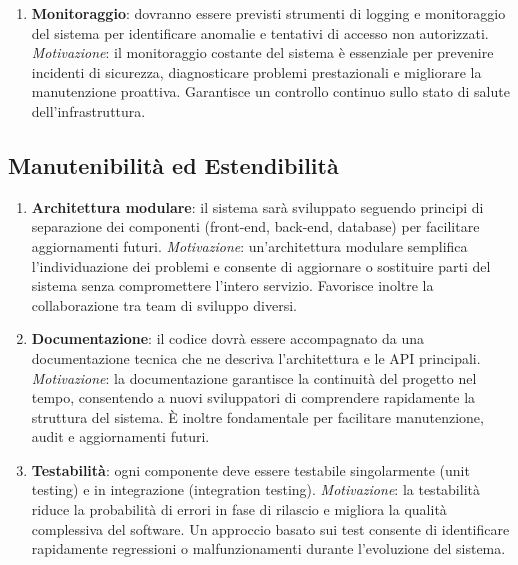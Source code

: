 \documentclass{article}
\begin{document}
\begin{enumerate}[label=\textbf{RNF\arabic*}, resume]
	\item \textbf{Monitoraggio}: dovranno essere previsti strumenti di logging e monitoraggio del sistema per identificare anomalie e tentativi di accesso non autorizzati.  
	\textit{Motivazione}: il monitoraggio costante del sistema è essenziale per prevenire incidenti di sicurezza, diagnosticare problemi prestazionali e migliorare la manutenzione proattiva. Garantisce un controllo continuo sullo stato di salute dell’infrastruttura.
\end{enumerate}

\subsection{Manutenibilit\`a ed Estendibilit\`a}
\begin{enumerate}[label=\textbf{RNF\arabic*}, resume]
	\item \textbf{Architettura modulare}: il sistema sarà sviluppato seguendo principi di separazione dei componenti (front-end, back-end, database) per facilitare aggiornamenti futuri.  
	\textit{Motivazione}: un’architettura modulare semplifica l’individuazione dei problemi e consente di aggiornare o sostituire parti del sistema senza compromettere l’intero servizio. Favorisce inoltre la collaborazione tra team di sviluppo diversi.

	\item \textbf{Documentazione}: il codice dovrà essere accompagnato da una documentazione tecnica che ne descriva l’architettura e le API principali.  
	\textit{Motivazione}: la documentazione garantisce la continuità del progetto nel tempo, consentendo a nuovi sviluppatori di comprendere rapidamente la struttura del sistema. È inoltre fondamentale per facilitare manutenzione, audit e aggiornamenti futuri.

	\item \textbf{Testabilità}: ogni componente deve essere testabile singolarmente (unit testing) e in integrazione (integration testing).  
	\textit{Motivazione}: la testabilità riduce la probabilità di errori in fase di rilascio e migliora la qualità complessiva del software. Un approccio basato sui test consente di identificare rapidamente regressioni o malfunzionamenti durante l’evoluzione del sistema.
\end{enumerate}
\end{document}
